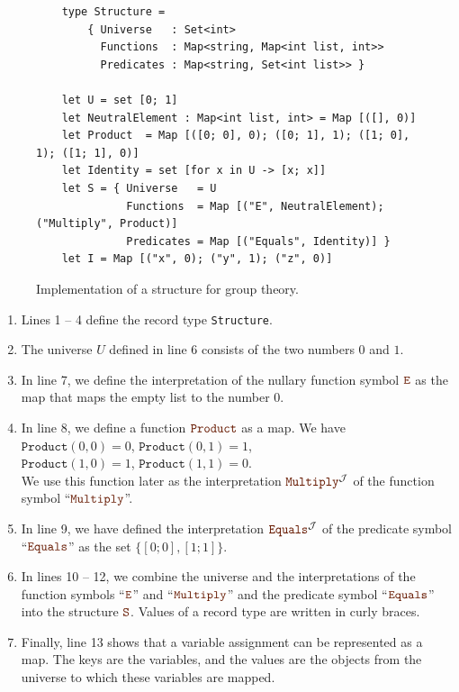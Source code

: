 \begin{figure}[!ht]
\centering
\begin{verbatim}
    type Structure =
        { Universe   : Set<int>
          Functions  : Map<string, Map<int list, int>>
          Predicates : Map<string, Set<int list>> }

    let U = set [0; 1]
    let NeutralElement : Map<int list, int> = Map [([], 0)]
    let Product  = Map [([0; 0], 0); ([0; 1], 1); ([1; 0], 1); ([1; 1], 0)]
    let Identity = set [for x in U -> [x; x]]
    let S = { Universe   = U
              Functions  = Map [("E", NeutralElement); ("Multiply", Product)]
              Predicates = Map [("Equals", Identity)] }
    let I = Map [("x", 0); ("y", 1); ("z", 0)]
\end{verbatim}
\vspace*{-0.3cm}
\caption{Implementation of a structure for group theory.}
\label{fig:Group.ipynb}
\end{figure}
\begin{enumerate}
\item Lines 1 -- 4 define the record type \texttt{Structure}.
\item The universe $U$ defined in line 6 consists of the two numbers $0$ and $1$.
\item In line 7, we define the interpretation of the nullary function symbol $\mytt{E}$
      as the map that maps the empty list to the number $0$.
\item In line 8, we define a function $\mytt{Product}$ as a map.  We have
      \\[0.2cm]
      \hspace*{1.3cm}
      $\mathtt{Product}(0,0) = 0$, \quad
      $\mathtt{Product}(0,1) = 1$, 
      \\[0.2cm]
      \hspace*{1.3cm}
      $\mathtt{Product}(1,0) = 1$, \quad
      $\mathtt{Product}(1,1) = 0$.
      \\[0.2cm]  
      We use this function later as the interpretation $\mytt{Multiply}^\mathcal{J}$ of the function symbol ``$\mytt{Multiply}$''.
\item In line 9, we have defined the interpretation $\mytt{Equals}^\mathcal{J}$ of
      the predicate symbol ``$\mytt{Equals}$'' as the set $\{ [0;0], [1;1]\}$.
\item In lines 10 -- 12, we combine the universe and the interpretations of the function symbols ``$\mytt{E}$'' and
      ``$\mytt{Multiply}$'' and the predicate symbol ``$\mytt{Equals}$'' into the structure $\mytt{S}$.  Values of a
      record type are written in curly braces.
\item Finally, line 13 shows that a variable assignment can be represented as a map. The keys
      are the variables, and the values are the objects from the universe to which these variables
      are mapped.
\end{enumerate}



